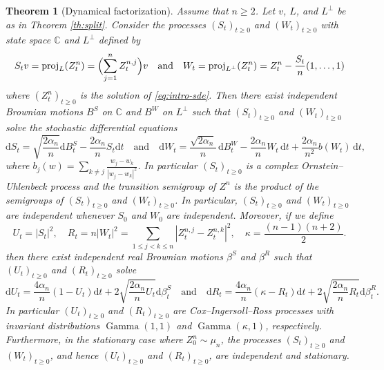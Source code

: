 \documentclass[11pt,reqno]{amsart}
\numberwithin{equation}{section}%
\numberwithin{figure}{section}%
\numberwithin{table}{section}
\theoremstyle{plain}
\newtheorem{theorem}{Theorem}[section]
\theoremstyle{definition}
\begin{document}
\begin{theorem}[Dynamical factorization]
  \label{th:split:dynamical}
  Assume that $n\geq2$. Let $v$, $L$, and $L^\perp$ be as in Theorem
  \ref{th:split}. Consider the processes ${(S_t)}_{t\geq0}$ and
  ${(W_t)}_{t\geq0}$ with state space $\mathbb{C}$ and $L^\perp$ defined by
  \[
    S_tv=\operatorname{proj}_L(Z_t^n)=\Bigl(\sum_{j=1}^n Z_t^{n,j}\Bigr)v
    \quad\text{and}\quad
    W_t=\operatorname{proj}_{L^\perp}(Z_t^n)=Z_t^n-\frac{S_t}{n}(1,\ldots,1)
  \]
  where $(Z_t^n)_{t\geq0}$ is the solution of \eqref{eq:intro-sde}. Then there
  exist independent Brownian motions $B^S$ on $\mathbb{C}$ and $B^W$ on
  $L^\perp$ such that ${(S_t)}_{t\geq0}$ and ${(W_t)}_{t\geq0}$ solve the
  stochastic differential equations
  \begin{equation}\label{eq:center-relative-sde}
    \mathrm{d}S_t=\sqrt{\frac{2\alpha_n}{n}}\mathrm{d}B_t^S-\frac{2\alpha_n}{n}S_t\mathrm{d}t
    \quad\text{and}\quad
    \mathrm{d}W_t
    =
    \frac{\sqrt{2\alpha_n}}{n}\,\mathrm{d}B_t^W
    -\frac{2\alpha_n}{n}W_t\,\mathrm{d}t
    +\frac{2\alpha_n}{n^2}b(W_t)\,\mathrm{d}t,
  \end{equation}
  where $b_j(w)=\sum_{k\neq j}\frac{w_j-w_k}{|w_j-w_k|^2}$. In particular
  ${(S_t)}_{t\geq0}$ is a complex Ornstein--Uhlenbeck process and the
  transition semigroup of $Z^n$ is the product of the semigroups of
  ${(S_t)}_{t\geq0}$ and ${(W_t)}_{t\geq0}$. In particular, ${(S_t)}_{t\geq0}$
  and ${(W_t)}_{t\geq0}$ are independent whenever $S_0$ and $W_0$ are
  independent. Moreover, if we define
  \begin{equation}
    U_t=|S_t|^2,
    \quad
    R_t=n|W_t|^2
    =\sum_{1\leq j<k\leq n}|Z_t^{n,j}-Z_t^{n,k}|^2,
    \quad
    \kappa=\frac{(n-1)(n+2)}{2}.
  \end{equation}
  then there exist independent real Brownian motions $\beta^S$ and $\beta^R$
  such that ${(U_t)}_{t\geq0}$ and ${(R_t)}_{t\geq0}$ solve
  \begin{equation}
    \mathrm{d}U_t
    =
    \frac{4\alpha_n}{n}(1-U_t)\mathrm{d}t +2\sqrt{\frac{2\alpha_n}{n}U_t}\mathrm{d}\beta_t^S
    \quad\text{and}\quad
    \mathrm{d}R_t
    =
    \frac{4\alpha_n}{n}(\kappa-R_t)\mathrm{d}t +2\sqrt{\frac{2\alpha_n}{n}R_t}\mathrm{d}\beta_t^R.
  \end{equation}
  In particular ${(U_t)}_{t\geq0}$ and ${(R_t)}_{t\geq0}$ are
  Cox--Ingersoll--Ross processes with invariant distributions
  $\operatorname{Gamma}(1,1)$ and $\operatorname{Gamma}(\kappa,1)$,
  respectively. Furthermore, in the stationary case where $Z_0^n\sim\mu_n$,
  the processes $(S_t)_{t\geq0}$ and $(W_t)_{t\geq0}$, and hence
  ${(U_t)}_{t\geq0}$ and ${(R_t)}_{t\geq0}$, are independent and stationary.
\end{theorem}
\end{document}
